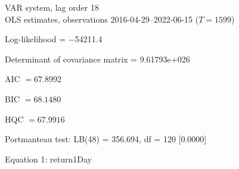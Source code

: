 \begin{center}
VAR system, lag order 18\\
OLS estimates, observations 2016-04-29--2022-06-15 ($T=1599$)
\end{center}
\noindent
Log-likelihood = $-$54211.4\par
\noindent
Determinant of covariance matrix = 9.61793\textrm{e+026}\par
\noindent
AIC $= 67.8992$ \par
\noindent
BIC $= 68.1480$ \par
\noindent
HQC $= 67.9916$ \par
\noindent
Portmanteau test: LB(48) = 356.694, df = 120 [0.0000]\par
\begin{center}

Equation 1: return1Day\\

\vspace{1em}


\end{center}
